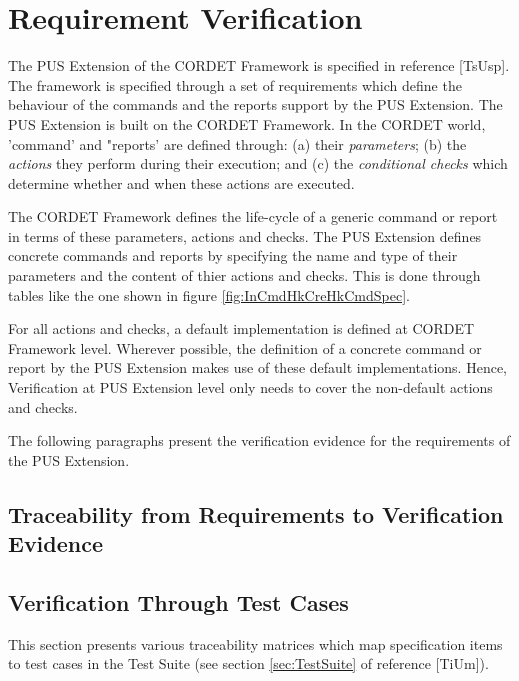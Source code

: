 \documentclass{pnp_article}
\begin{document}
\section{Requirement Verification}\label{sec:svrReqVer} 
The PUS Extension of the CORDET Framework is specified in reference [TsUsp]. The framework is specified through a set of requirements which define the behaviour of the commands and the reports support by the PUS Extension. The PUS Extension is built on the CORDET Framework. In the CORDET world, 'command' and "reports' are defined through: (a) their \textit{parameters}; (b) the \textit{actions} they perform during their execution; and (c) the \textit{conditional checks} which determine whether and when these actions are executed. 

The CORDET Framework defines the life-cycle of a generic command or report in terms of these parameters, actions and checks. The PUS Extension defines concrete commands and reports by specifying the name and type of their parameters and the content of thier actions and checks. This is done through tables like the one shown in figure \ref{fig:InCmdHkCreHkCmdSpec}. 


For all actions and checks, a default implementation is defined at CORDET Framework level. Wherever possible, the definition of a concrete command or report by the PUS Extension makes use of these default implementations. Hence, Verification at PUS Extension level only needs to cover the non-default actions and checks.

The following paragraphs present the verification evidence for the requirements of the PUS Extension.

\subsection{Traceability from Requirements to Verification Evidence}



\subsection{Verification Through Test Cases}
This section presents various traceability matrices which map specification items to test cases in the Test Suite (see section \ref{sec:TestSuite} of reference [TiUm]). 
\end{document}
